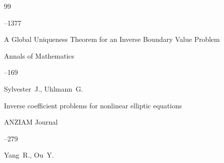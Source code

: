 \begin{thebibliography}{99}



--1377



















\paper A Global Uniqueness Theorem for an Inverse Boundary Value Problem

\jour Annals of Mathematics 



--169

\by Sylvester~J., Uhlmann~G.





\paper Inverse coefficient problems for nonlinear elliptic equations

\jour ANZIAM Journal 




--279

\by Yang~R., Ou~Y.









\end{thebibliography}
